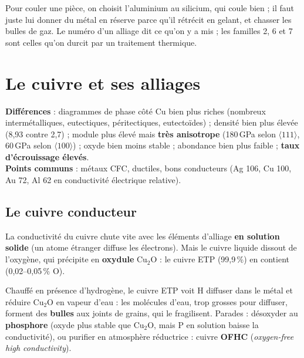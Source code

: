\begin{goatbox}
Pour couler une pièce, on choisit l'aluminium au silicium, qui coule bien ; il faut juste lui
donner du métal en réserve parce qu'il rétrécit en gelant, et chasser les bulles de gaz. Le
numéro d'un alliage dit ce qu'on y a mis ; les familles 2, 6 et 7 sont celles qu'on durcit par
un traitement thermique.
\end{goatbox}

\section{Le cuivre et ses alliages}

\begin{propbox}[title={Cuivre et aluminium : différences et points communs}]
\textbf{Différences} : diagrammes de phase côté Cu bien plus riches (nombreux intermétalliques,
eutectiques, péritectiques, eutectoïdes) ; densité bien plus élevée (8,93 contre 2,7) ; module
plus élevé mais \textbf{très anisotrope} (180\,GPa selon $\langle111\rangle$, 60\,GPa selon
$\langle100\rangle$) ; oxyde bien moins stable ; abondance bien plus faible ; \textbf{taux
d'écrouissage élevés}. \\
\textbf{Points communs} : métaux CFC, ductiles, bons conducteurs (Ag 106, Cu 100, Au 72, Al 62 en
conductivité électrique relative).
\end{propbox}

\subsection*{Le cuivre conducteur}

La conductivité du cuivre chute vite avec les éléments d'alliage \textbf{en solution solide}
(un atome étranger diffuse les électrons). Mais le cuivre liquide dissout de l'oxygène, qui
précipite en \textbf{oxydule} Cu$_2$O : le cuivre ETP (99,9\,\%) en contient (0,02--0,05\,\% O).

\begin{warnbox}[title={La maladie de l'hydrogène}]
Chauffé en présence d'hydrogène, le cuivre ETP voit H diffuser dans le métal et réduire Cu$_2$O
en vapeur d'eau : les molécules d'eau, trop grosses pour diffuser, forment des
\textbf{bulles} aux joints de grains, qui le fragilisent. Parades : désoxyder au
\textbf{phosphore} (oxyde plus stable que Cu$_2$O, mais P en solution baisse la conductivité),
ou purifier en atmosphère réductrice : cuivre \textbf{OFHC} (\emph{oxygen-free high
conductivity}).
\end{warnbox}

